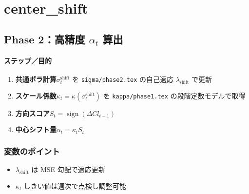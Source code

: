 
\section*{center\_shift}\nopagebreak[4]

\subsection*{Phase 2：高精度 $\alpha_t$ 算出}\nopagebreak[4]
\paragraph{ステップ／目的}
\begin{flushleft}
\begin{enumerate}
  \item \textbf{共通ボラ計算}\;\(\sigma_t^{\text{shift}}\) を
        {\scriptsize\verb|sigma/phase2.tex|} の自己適応
        $\lambda_{\text{shift}}$ で更新
  \item \textbf{スケール係数}\;\(\kappa_t=\kappa(\sigma_t^{\text{shift}})\) を
        {\scriptsize\verb|kappa/phase1.tex|} の段階定数モデルで取得
  \item \textbf{方向スコア}\;\(S_t=\operatorname{sign}(\Delta Cl_{t-1})\)
  \item \textbf{中心シフト量}\;\(\alpha_t=\kappa_t S_t\)
\end{enumerate}
\end{flushleft}

\subsubsection*{変数のポイント}
\begin{flushleft}
\begin{itemize}
  \item $\lambda_{\text{shift}}$ は MSE 勾配で適応更新
  \item \(\kappa_t\) しきい値は週次で点検し調整可能
\end{itemize}
\end{flushleft}

